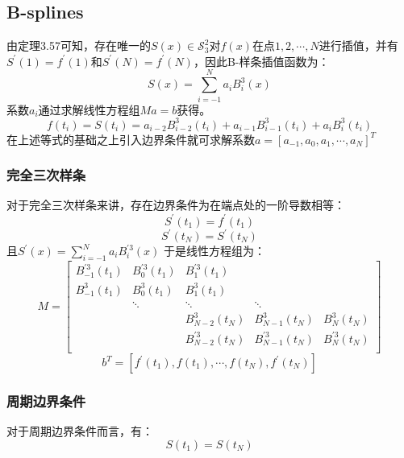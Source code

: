 \documentclass[a4paper]{article}
\begin{document}
\subsection{B-splines}
由定理3.57可知，存在唯一的$S(x)\in \mathcal{S}_3^2$对$f(x)$在点$1,2,\cdots,N$进行插值，并有$S^\prime(1)=f^\prime(1)$和$S^\prime(N) = f^\prime(N)$，因此B-样条插值函数为：
\begin{equation}
    S(x) = \sum_{i=-1}^{N}a_i B_{i}^3(x)
\end{equation}
系数$a_i$通过求解线性方程组$Ma=b$获得。
\begin{equation}
    f(t_i)=S(t_i) = a_{i-2}B^3_{i-2}(t_i)+a_{i-1}B^3_{i-1}(t_i)+a_{i}B^3_{i}(t_i)
\end{equation}
在上述等式的基础之上引入边界条件就可求解系数$a= [a_{-1},a_0,a_1,\cdots,a_{N}]^T$
\subsubsection{完全三次样条}
对于完全三次样条来讲，存在边界条件为在端点处的一阶导数相等：
\begin{equation}
    S^\prime(t_1)= f^\prime(t_1)
\end{equation}
\begin{equation}
    S^\prime(t_N) = S^\prime(t_N)
\end{equation}
且$S^\prime(x) = \sum_{i=-1}^{N}a_i B_i^{\prime 3}(x)$
于是线性方程组为：
\begin{equation}
    M = \begin{bmatrix}
        B_{-1}^{\prime 3}(t_1)& B_{0}^{\prime 3}(t_1) &B_{1}^{\prime 3}(t_1)\\
        B_{-1}^3(t_1) &B_{0}^3(t_1)&B_{1}^3(t_1)\\
        &\ddots &\ddots&\ddots&\\
        &&B_{N-2}^3(t_N)&B_{N-1}^3(t_N)&B_{N}^3(t_N)\\
        &&B_{N-2}^{\prime 3}(t_N)&B_{N-1}^{\prime3}(t_N)&B_{N}^{\prime3}(t_N)\\
    \end{bmatrix}
\end{equation}
\begin{equation}
    b^T = [f^\prime(t_1),f(t_1),\cdots,f(t_N),f^{\prime}(t_N)]
\end{equation}

\subsubsection{周期边界条件}
对于周期边界条件而言，有：
\begin{equation}
    S(t_1) = S(t_N)
\end{equation}
\end{document}
